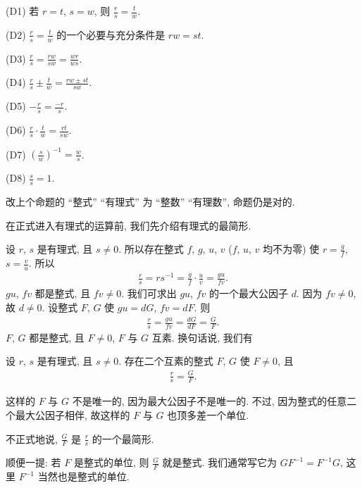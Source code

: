 \begin{proposition}
    (D1) 若 $r = t$, $s = w$, 则 $\frac{r}{s} = \frac{t}{w}$.

    (D2) $\frac{r}{s} = \frac{t}{w}$ 的一个必要与充分条件是 $rw = st$.

    (D3) $\frac{r}{s} = \frac{rw}{sw} = \frac{wr}{ws}$.

    (D4) $\frac{r}{s} \pm \frac{t}{w} = \frac{rw \pm st}{sw}$.

    (D5) $-\frac{r}{s} = \frac{-r}{s}$.

    (D6) $\frac{r}{s} \cdot \frac{t}{w} = \frac{rt}{sw}$.

    (D7) $\left( \frac{s}{w} \right)^{-1} = \frac{w}{s}$.

    (D8) $\frac{s}{s} = 1$.
\end{proposition}

\begin{remark}
    改上个命题的 ``整式'' ``有理式'' 为 ``整数'' ``有理数'', 命题仍是对的.
\end{remark}

在正式进入有理式的运算前, 我们先介绍有理式的最简形.

设 $r$, $s$ 是有理式, 且 $s \neq 0$. 所以存在整式 $f$, $g$, $u$, $v$ ($f$, $u$, $v$ 均不为零) 使 $r = \frac{g}{f}$, $s = \frac{v}{u}$. 所以
\begin{align*}
    \frac{r}{s} = rs^{-1} = \frac{g}{f} \cdot \frac{u}{v} = \frac{gu}{fv}.
\end{align*}
$gu$, $fv$ 都是整式, 且 $fv \neq 0$. 我们可求出 $gu$, $fv$ 的一个最大公因子 $d$. 因为 $fv \neq 0$, 故 $d \neq 0$. 设整式 $F$, $G$ 使 $gu = dG$, $fv = dF$. 则
\begin{align*}
    \frac{r}{s} = \frac{gu}{fv} = \frac{dG}{dF} = \frac{G}{F}.
\end{align*}
$F$, $G$ 都是整式, 且 $F \neq 0$, $F$ 与 $G$ 互素. 换句话说, 我们有
\begin{proposition}
    设 $r$, $s$ 是有理式, 且 $s \neq 0$. 存在二个互素的整式 $F$, $G$ 使 $F \neq 0$, 且
    \begin{align*}
        \frac{r}{s} = \frac{G}{F}.
    \end{align*}
\end{proposition}

这样的 $F$ 与 $G$ 不是唯一的, 因为最大公因子不是唯一的. 不过, 因为整式的任意二个最大公因子相伴, 故这样的 $F$ 与 $G$ 也顶多差一个单位.

不正式地说, $\frac{G}{F}$ 是 $\frac{r}{s}$ 的一个最简形.

顺便一提: 若 $F$ 是整式的单位, 则 $\frac{G}{F}$ 就是整式. 我们通常写它为 $GF^{-1} = F^{-1} G$, 这里 $F^{-1}$ 当然也是整式的单位.

